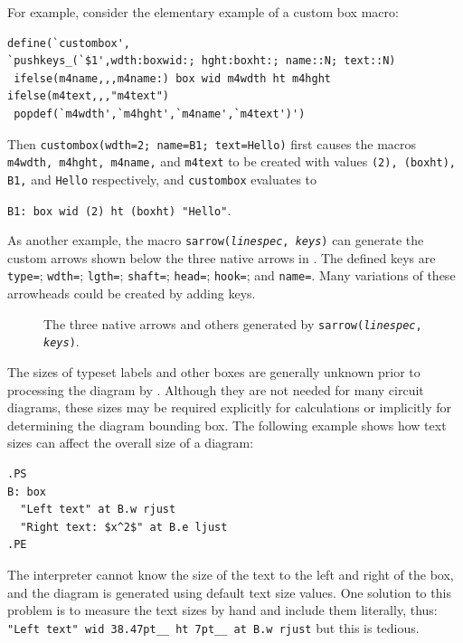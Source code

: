 For example, consider the elementary example of a custom box macro:

\begin{verbatim}
define(`custombox',
`pushkeys_(`$1',wdth:boxwid:; hght:boxht:; name::N; text::N)
 ifelse(m4name,,,m4name:) box wid m4wdth ht m4hght ifelse(m4text,,,"m4text")
 popdef(`m4wdth',`m4hght',`m4name',`m4text')')
\end{verbatim}

Then {\tt custombox(wdth=2; name=B1; text=Hello)}
first causes the macros {\tt m4wdth, m4hght, m4name,} and {\tt m4text}
to be created with values {\tt (2), (boxht), B1,} and {\tt Hello}
respectively, and {\tt custombox} evaluates to

{\tt B1:\ box wid (2) ht (boxht) "Hello"}.


As another example, the macro
{\tt sarrow({\sl linespec}, {\sl keys})}
can generate the custom arrows shown below the three native arrows
in .  The defined keys are
 {\tt type=}; {\tt wdth=}; {\tt lgth=};
 {\tt shaft=}; {\tt head=}; {\tt hook=}; and {\tt name=}. 
Many variations of these arrowheads could be created by adding keys.
\begin{figure}[H]
   
   \caption{The three \dpic native arrows and others generated by
    {\tt sarrow({\sl linespec}, {\sl keys})}.}
   \label{arrowex}
   \end{figure}


\enlargethispage{\baselineskip}
The sizes of typeset labels and other \tex boxes are generally unknown
prior to processing the diagram by \latex.
Although they are not needed for many circuit diagrams,
these sizes may be required explicitly for calculations or implicitly
for determining the diagram bounding box.  
The following example shows how text sizes can affect the overall size of
a diagram:

\begin{verbatim}
.PS
B: box
  "Left text" at B.w rjust
  "Right text: $x^2$" at B.e ljust
.PE
\end{verbatim}

The \pic interpreter cannot know the size of the text to the left
and right of the box, and the diagram is generated using
default text size values.  One solution to this problem is to measure the
text sizes by hand and include them literally, thus:\hfill\break
\hbox{}\quad%
\verb|"Left text" wid 38.47pt__ ht 7pt__ at B.w rjust|\hfill\break
but this is tedious.

